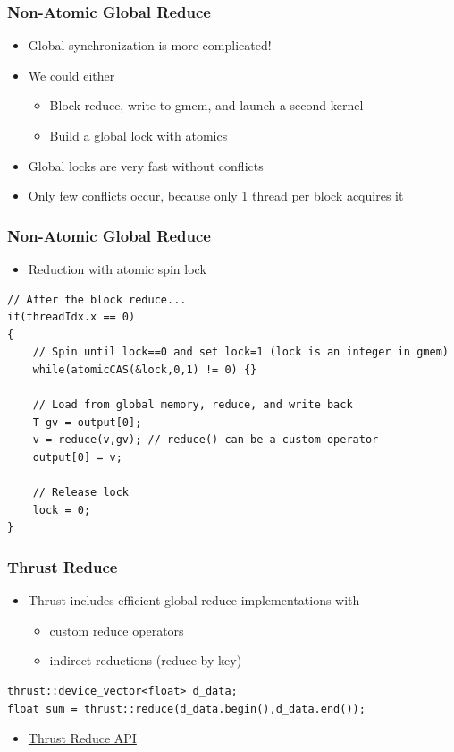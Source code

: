 \documentclass[aspectratio=169,handout]{beamer}
\begin{document}
\begin{frame}[fragile]
\frametitle{Non-Atomic Global Reduce}
\begin{itemize}
	\item Global synchronization is more complicated!
	\item<2-> We could either
	\begin{itemize}
		\item Block reduce, write to gmem, and launch a second kernel
		\item Build a global lock with atomics
	\end{itemize}
	\item<3->[$\rightarrow$] Global locks are very fast without conflicts
	\item<4->[$\rightarrow$] Only few conflicts occur, because only 1 thread per block acquires it
\end{itemize}

\end{frame}


\begin{frame}[fragile]
\frametitle{Non-Atomic Global Reduce}
\label{si:spinlock}
\begin{itemize}
	\item Reduction with atomic spin lock
\end{itemize}
\begin{lstlisting}
// After the block reduce...
if(threadIdx.x == 0)
{
	// Spin until lock==0 and set lock=1 (lock is an integer in gmem)
	while(atomicCAS(&lock,0,1) != 0) {}
	
	// Load from global memory, reduce, and write back
	T gv = output[0];
	v = reduce(v,gv); // reduce() can be a custom operator
	output[0] = v;
	
	// Release lock
	lock = 0;
}
\end{lstlisting}
\end{frame}


\begin{frame}[fragile]
\frametitle{Thrust Reduce}
\begin{itemize}
	\item Thrust includes efficient global reduce implementations with
	\begin{itemize}
		\item custom reduce operators
		\item indirect reductions (reduce by key)
	\end{itemize}
\end{itemize}
\begin{lstlisting}
thrust::device_vector<float> d_data;
float sum = thrust::reduce(d_data.begin(),d_data.end());
\end{lstlisting}
\begin{itemize}
	\item \href{https://thrust.github.io/doc/group__reductions.html}{Thrust Reduce API}
	
\end{itemize}
\end{frame}
\end{document}
